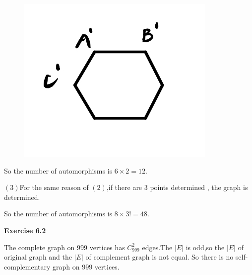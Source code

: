 \documentclass{article} %
\begin{document}
    \begin{figure}[H]
		\centering
		\includegraphics[scale=0.4]{p33.jpg}
		\caption{}
		\label{fig:3}
	\end{figure}
    So the number of automorphisms is $6 \times 2 = 12.$\par
    $(3)$For the same reason of $(2)$,if there are 3 points  determined , the graph is determined.\par
    So the number of automorphisms is $8 \times 3! = 48$.


	\textbf{Exercise 6.2}\par
    The complete graph on $999$ vertices has $C_{999}^{2}$ edges.The $|E|$ is odd,so the $|E|$ of original graph and the $|E|$ of complement graph is not equal.
    So there is no self-complementary graph on $999$ vertices.
\end{document}
